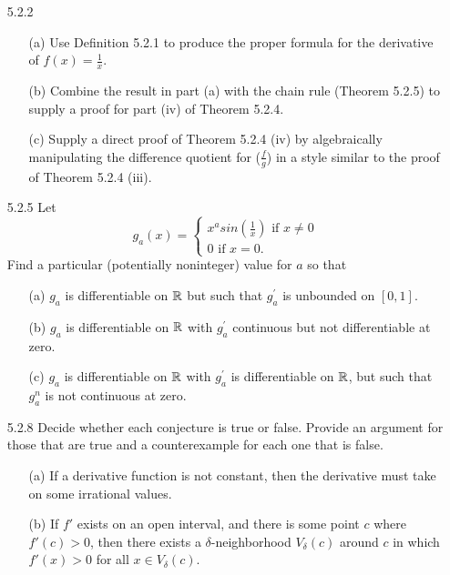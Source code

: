 \documentclass[12pt,letterpaper]{article}
\begin{document}
    \begin{itemize}[leftmargin=!,labelindent=5pt]
        \item [5.2.2] 
            \begin{itemize}
                \item [(a)] Use Definition 5.2.1 to produce the proper formula for the derivative of $f(x) = \frac{1}{x}$.
                \item [(b)] Combine the result in part (a) with the chain rule (Theorem 5.2.5) to supply a proof for part (iv) of Theorem 5.2.4.
                \item [(c)] Supply a direct proof of Theorem 5.2.4 (iv) by algebraically manipulating the difference quotient for ($\frac{f}{g}$) in a style similar to the proof of Theorem 5.2.4 (iii).
            \end{itemize}
        \item [5.2.5] Let
            \[
                g_a(x) = 
            \begin{cases}
                x^a sin(\frac{1}{x}) \text{ if } x \neq 0 \\
                0 \text{ if } x = 0.
            \end{cases}
            \]
            Find a particular (potentially noninteger) value for $a$ so that
            \begin{itemize}
                \item [(a)] $g_a$ is differentiable on $\mathbb{R}$ but such that $g_a^{'}$ is unbounded on $[0,1]$.
                \item [(b)] $g_a$ is differentiable on $\mathbb{R}$ with $g_a^{'}$ continuous but not differentiable at zero.
                \item [(c)] $g_a$ is differentiable on $\mathbb{R}$ with $g_a^{'}$ is differentiable on $\mathbb{R}$, but such that $g_a^n$ is not continuous at zero.
            \end{itemize}
        \item [5.2.8] Decide whether each conjecture is true or false. Provide an argument for those that are true and a counterexample for each one that is false.
            \begin{itemize}
                \item [(a)] If a derivative function is not constant, then the derivative must take on
                some irrational values.
                \item [(b)] If $f'$ exists on an open interval, and there is some point $c$ where $f'(c) > 0$, then there exists a $\delta$-neighborhood $V_\delta(c)$ around $c$ in which $f'(x) > 0$ for all $x \in V_\delta(c)$.

\end{itemize}
\end{itemize}
\end{document}
